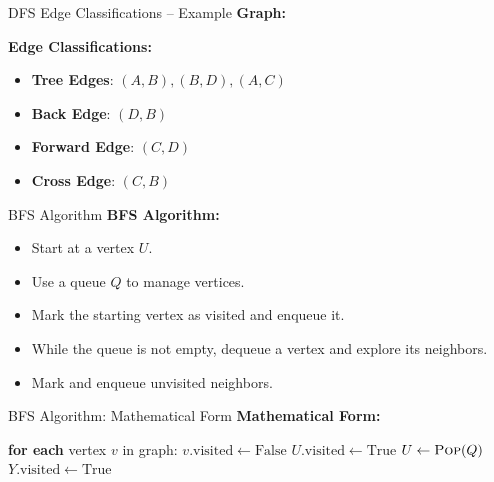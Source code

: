 \documentclass{beamer}
\begin{document}
\begin{frame}{DFS Edge Classifications – Example}
    \textbf{Graph:}
    \begin{center}
    \end{center}

    \textbf{Edge Classifications:}
    \begin{itemize}
        \item \textbf{Tree Edges}: \( (A, B), (B, D), (A, C) \)
        \item \textbf{Back Edge}: \( (D, B) \)
        \item \textbf{Forward Edge}: \( (C, D) \)
        \item \textbf{Cross Edge}: \( (C, B) \)
    \end{itemize}
\end{frame}

\begin{frame}{BFS Algorithm}
    \textbf{BFS Algorithm:}
    \begin{itemize}
        \item Start at a vertex \( U \).
        \item Use a queue \( Q \) to manage vertices.
        \item Mark the starting vertex as visited and enqueue it.
        \item While the queue is not empty, dequeue a vertex and explore its neighbors.
        \item Mark and enqueue unvisited neighbors.
    \end{itemize}
\end{frame}

\begin{frame}{BFS Algorithm: Mathematical Form}
    \textbf{Mathematical Form:}
    \begin{algorithmic}[1]
        \State \textbf{for each} vertex $v$ in graph: $v.\text{visited} \gets \text{False}$ 
        \State {}
        \State $U.\text{visited} \gets \text{True}$
            \State $ U \gets \Call{Pop}{Q} $
                    \State $Y.\text{visited} \gets \text{True}$
                    \State {}
                \EndIf
            \EndFor
        \EndWhile
        \EndProcedure
    \end{algorithmic}
\end{frame}
\end{document}
